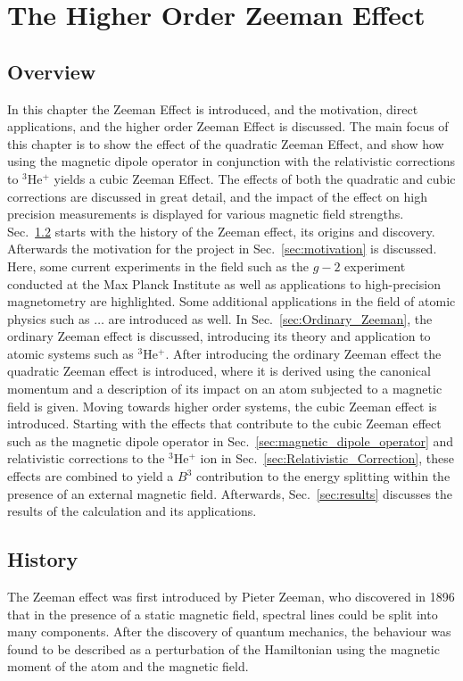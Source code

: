 

\chapter{The Higher Order Zeeman Effect}\label{sec:Zeeman-Effect}
    \section{Overview}
        In this chapter the Zeeman Effect is introduced, and the motivation, direct applications, and the higher order Zeeman Effect is discussed. The main focus of this chapter is to show the effect of the quadratic Zeeman Effect, and show how using the magnetic dipole operator in conjunction with the relativistic corrections to $^3$He$^+$ yields a cubic Zeeman Effect. The effects of both the quadratic and cubic corrections are discussed in great detail, and the impact of the effect on high precision measurements is displayed for various magnetic field strengths.\\

       Sec.~\ref{sec:history} starts with the history of the Zeeman effect, its origins and discovery. Afterwards the motivation for the project in Sec.~\ref{sec:motivation} is discussed. Here, some current experiments in the field such as the $g-2$ experiment conducted at the Max Planck Institute as well as applications to high-precision magnetometry are highlighted. Some additional applications in the field of atomic physics such as $\dots$ are introduced as well. In Sec.~\ref{sec:Ordinary_Zeeman}, the ordinary Zeeman effect is discussed, introducing its theory and application to atomic systems such as $^3$He$^+$. After introducing the ordinary Zeeman effect the quadratic Zeeman effect is introduced, where it is derived using the canonical momentum and a description of its impact on an atom subjected to a magnetic field is given. Moving towards higher order systems, the cubic Zeeman effect is introduced. Starting with the effects that contribute to the cubic Zeeman effect such as the magnetic dipole operator in Sec.~\ref{sec:magnetic_dipole_operator} and relativistic corrections to the $^3$He$^+$ ion in Sec.~\ref{sec:Relativistic_Correction}, these effects are combined to yield a $B^3$ contribution to the energy splitting within the presence of an external magnetic field. Afterwards, Sec.~\ref{sec:results} discusses the results of the calculation and its applications.

    \section{History}\label{sec:history}
        The Zeeman effect was first introduced by Pieter Zeeman, who discovered in 1896 that in the presence of a static magnetic field, spectral lines could be split into many components. After the discovery of quantum mechanics, the behaviour was found to be described as a perturbation of the Hamiltonian using the magnetic moment of the atom and the magnetic field.   
        
